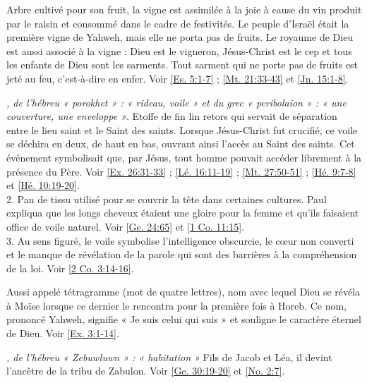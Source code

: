 \begin{multicols}{2}
\textit{}\newline
Arbre cultivé pour son fruit, la vigne est assimilée à la joie à cause du vin produit par le raisin et consommé dans le cadre de festivités. Le peuple d'Israël était la première vigne de Yahweh, mais elle ne porta pas de fruits. Le royaume de Dieu est aussi associé à la vigne : Dieu est le vigneron, Jésus-Christ est le cep et tous les enfants de Dieu sont les sarments. Tout sarment qui ne porte pas de fruits est jeté au feu, c'est-à-dire en enfer. Voir \vref{Es. 5:1-7} ; \vref{Mt. 21:33-43} et \vref{Jn. 15:1-8}.

\textit{, de l'hébreu « porokhet » : « rideau, voile » et du grec « peribolaion » : « une couverture, une enveloppe »}. Etoffe de fin lin retors qui servait de séparation entre le lieu saint et le Saint des saints. Lorsque Jésus-Christ fut crucifié, ce voile se déchira en deux, de haut en bas, ouvrant ainsi l'accès au Saint des saints. Cet événement symbolisait que, par Jésus, tout homme pouvait accéder librement à la présence du Père. Voir \vref{Ex. 26:31-33} ; \vref{Lé. 16:11-19} ; \vref{Mt. 27:50-51} ; \vref{Hé. 9:7-8} et \vref{Hé. 10:19-20}.
\\2. Pan de tissu utilisé pour se couvrir la tête dans certaines cultures. Paul expliqua que les longs cheveux étaient une gloire pour la femme et qu'ils faisaient office de voile naturel. Voir \vref{Ge. 24:65} et \vref{1 Co. 11:15}.
\\3. Au sens figuré, le voile symbolise l'intelligence obscurcie, le cœur non converti et le manque de révélation de la parole qui sont des barrières à la compréhension de la loi. Voir \vref{2 Co. 3:14-16}.

\textit{}\newline
Aussi appelé tétragramme (mot de quatre lettres), nom avec lequel Dieu se révéla à Moïse lorsque ce dernier le rencontra pour la première fois à Horeb. Ce nom, prononcé Yahweh, signifie « Je suis celui qui suis » et souligne le caractère éternel de Dieu. Voir \vref{Ex. 3:1-14}.

\textit{, de l'hébreu « Zebuwluwn » : « habitation »}\newline
Fils de Jacob et Léa, il devint l'ancêtre de la tribu de Zabulon. Voir \vref{Ge. 30:19-20} et \vref{No. 2:7}.


\end{multicols}
